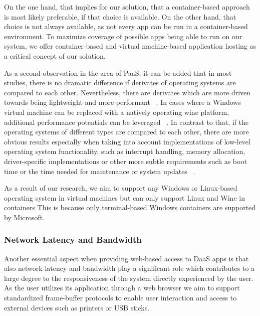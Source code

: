 \documentclass[runningheads]{llncs}
\begin{document}
On the one hand, that implies for our solution,
that a container-based approach is most likely preferable,
if that choice is available.
On the other hand, that  choice is not always available,
as not every app can be run in a container-based environment.
To maximize coverage of possible apps being able to run on our system,
we offer container-based and virtual machine-based application hosting
as a critical concept of our solution.

As a second observation in the area of PaaS, it can be added
that in most studies, there is no dramatic difference
if derivates of operating systems are compared to each other.
Nevertheless, there are derivates
which are more driven towards being lightweight and more performant
~\cite{balen2020performance,boras2020performance}.  %
In cases where a Windows virtual machine can be replaced with a natively operating wine platform,
additional performance potentials can be leveraged
~\cite{huang2012performance}.  %
In contrast to that, if the operating systems of different types are compared to each other,
there are more obvious results
especially when taking into account implementations of low-level operating system functionality,
such as interrupt handling, memory allocation, driver-specific implementations
or other more subtle requirements such as boot time
or the time needed for maintenance or system updates
~\cite{sergeev2022docker,sulaiman2021comparison}. %

As a result of our research, we aim to support
any Windows or Linux-based operating system in virtual machines
but can only support Linux and Wine in containers
This is because only terminal-based Windows containers are supported by Microsoft.

\subsubsection{Network Latency and Bandwidth}
Another essential aspect when providing web-based access to DaaS apps
is that also network latency and bandwidth play a significant role
which contributes to a large degree to the responsiveness of the system
directly experienced by the user.
As the user utilizes its application through a web browser
we aim to support standardized frame-buffer protocols
to enable user interaction and access to external devices such as printers or USB sticks.
\end{document}
